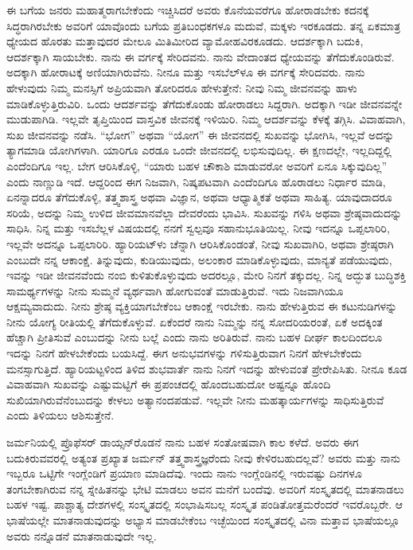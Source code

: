 ಈ ಬಗೆಯ ಜನರು ಮಹಾತ್ಮರಾಗಬೇಕೆಂದು ಇಚ್ಚಿಸಿದರೆ ಅವರು ಕೊನೆಯವರೆಗೂ ಹೋರಾಡಬೇಕು\enginline{-} ಕದನಕ್ಕೆ ಸಿದ್ಧರಾಗಿರಬೇಕು\enginline{-} ಅವರಿಗೆ ಯಾವೊಂದು ಬಗೆಯ ಪ್ರತಿಬಂಧಕಗಳೂ ಮದುವೆ, ಮಕ್ಕಳು ಇರಕೂಡದು. ತನ್ನ ಏಕಮಾತ್ರ ಧ್ಯೇಯದ ಹೊರತು ಮತ್ತಾವುದರ ಮೇಲೂ ಮಿತಿಮೀರಿದ ವ್ಯಾಮೋಹವಿರಕೂಡದು. ಆದರ್ಶಕ್ಕಾಗಿ ಬದುಕಿ, ಆದರ್ಶಕ್ಕಾಗಿ ಸಾಯಬೇಕು. ನಾನು ಈ ವರ್ಗಕ್ಕೆ ಸೇರಿದವನು. ನಾನು ವೇದಾಂತದ ಧ್ಯೇಯವನ್ನು ತೆಗೆದುಕೊಂಡಿರುವೆ. ಅದಕ್ಕಾಗಿ ಹೋರಾಟಕ್ಕೆ ಅಣಿಯಾಗಿರುವೆನು. ನೀನೂ ಮತ್ತು ಇಸಬೆಲ್‌ಳೂ ಈ ವರ್ಗಕ್ಕೆ ಸೇರಿದವರು. ನಾನು ಹೇಳುವುದು ನಿಮ್ಮ ಮನಸ್ಸಿಗೆ ಅಪ್ರಿಯವಾಗಿ ತೋರಿದರೂ ಹೇಳುತ್ತೇನೆ: ನೀವು ನಿಮ್ಮ ಜೀವನವನ್ನು ಹಾಳು ಮಾಡಿಕೊಳ್ಳುತ್ತಿರುವಿರಿ. ಒಂದು ಆದರ್ಶವನ್ನು ತೆಗೆದುಕೊಂಡು ಹೋರಾಡಲು ಸಿದ್ದರಾಗಿ. ಅದಕ್ಕಾಗಿ ಇಡೀ ಜೀವನವನ್ನೇ ಮುಡುಪಾಗಿಡಿ. ಇಲ್ಲವೇ ತೃಪ್ತಿಯಿಂದ ವಾಸ್ತವಿಕ ಜೀವನಕ್ಕೆ ಇಳಿಯಿರಿ. ನಿಮ್ಮ ಆದರ್ಶವನ್ನು ಕೆಳಕ್ಕೆ ತಗ್ಗಿಸಿ. ವಿವಾಹವಾಗಿ, ಸುಖ ಜೀವನವನ್ನು ನಡೆಸಿ. “ಭೋಗ” ಅಥವಾ “ಯೋಗ”\enginline{-} ಈ ಜೀವನದಲ್ಲಿ ಸುಖವನ್ನು ಭೋಗಿಸಿ, ಇಲ್ಲವೆ ಅದನ್ನು ತ್ಯಾಗಮಾಡಿ ಯೋಗಿಗಳಾಗಿ. ಯಾರಿಗೂ ಎರಡೂ ಒಂದೇ ಜೀವನದಲ್ಲಿ ಲಭಿಸುವುದಿಲ್ಲ. ಈ ಕ್ಷಣದಲ್ಲೇ, ಇಲ್ಲದಿದ್ದಲ್ಲಿ ಎಂದೆಂದಿಗೂ ಇಲ್ಲ. ಬೇಗ ಆರಿಸಿಕೊಳ್ಳಿ, ``ಯಾರು ಬಹಳ ಚೌಕಾಶಿ ಮಾಡುವರೋ ಅವರಿಗೆ ಏನೂ ಸಿಕ್ಕುವುದಿಲ್ಲ'' ಎಂದು ನಾಣ್ಣುಡಿ ಇದೆ. ಆದ್ದರಿಂದ ಈಗ ನಿಜವಾಗಿ, ನಿಷ್ಕಪಟವಾಗಿ ಎಂದೆಂದಿಗೂ ಹೊರಾಡಲು ನಿರ್ಧಾರ ಮಾಡಿ, ಏನನ್ನಾದರೂ ತೆಗೆದುಕೊಳ್ಳಿ, ತತ್ತ್ವಶಾಸ್ತ್ರ ಅಥವಾ ವಿಜ್ಞಾನ, ಅಥವಾ ಆಧ್ಯಾತ್ಮಿಕತೆ ಅಥವಾ ಸಾಹಿತ್ಯ. ಯಾವುದಾದರೂ ಸರಿಯೆ, ಅದನ್ನು ನಿಮ್ಮ ಉಳಿದ ಜೀವಮಾನವೆಲ್ಲಾ ದೇವರೆಂದು ಭಾವಿಸಿ. ಸುಖವನ್ನು ಗಳಿಸಿ ಅಥವಾ ಶ್ರೇಷ್ಠವಾದುದನ್ನು ಸಾಧಿಸಿ. ನಿನ್ನ ಮತ್ತು ಇಸಬೆಲ್ಲಳ ವಿಷಯದಲ್ಲಿ ನನಗೆ ಸ್ವಲ್ಪವೂ ಸಹಾನುಭೂತಿಯಿಲ್ಲ. ನೀವು ಇದನ್ನೂ ಒಪ್ಪಲಾರಿರಿ, ಇಲ್ಲವೇ ಅದನ್ನೂ ಒಪ್ಪಲಾರಿರಿ. ಹ್ಯಾರಿಯಟ್‌ಳು ಚೆನ್ನಾಗಿ ಆರಿಸಿಕೊಂಡಂತೆ, ನೀವು ಸುಖವಾಗಿರಿ, ಅಥವಾ ಶ್ರೇಷ್ಠರಾಗಿ ಎಂಬುದೇ ನನ್ನ ಆಕಾಂಕ್ಷೆ. ತಿನ್ನುವುದು, ಕುಡಿಯುವುದು, ಅಲಂಕಾರ ಮಾಡಿಕೊಳ್ಳುವುದು, ಮಾನ್ಯತೆ ಪಡೆಯುವುದು, ಇವನ್ನು ಇಡೀ ಜೀವನವೆಂದು ನಂಬಿ ಕುಳಿತುಕೊಳ್ಳುವುದು\enginline{-} ಅದರಲ್ಲೂ, ಮೇರಿ ನಿನಗೆ ತಕ್ಕುದಲ್ಲ. ನಿನ್ನ ಅದ್ಭುತ ಬುದ್ಧಿಶಕ್ತಿ ಸಾಮರ್ಥ್ಯಗಳನ್ನು ನೀನು ಸುಮ್ಮನೆ ವ್ಯರ್ಥವಾಗಿ ಹೋಗುವಂತೆ ಮಾಡುತ್ತಿರುವೆ. ಇದು ನಿಜವಾಗಿಯೂ ಆಕ್ಷಮ್ಯವಾದುದು. ನೀನು ಶ್ರೇಷ್ಠ ವ್ಯಕ್ತಿಯಾಗಬೇಕೆಂಬ ಆಕಾಂಕ್ಷೆ ಇರಬೇಕು. ನಾನು ಹೇಳುತ್ತಿರುವ ಈ ಕಟುನುಡಿಗಳನ್ನು ನೀನು ಯೋಗ್ಯ ರೀತಿಯಲ್ಲಿ ತೆಗೆದುಕೊಳ್ಳುವೆ. ಏಕೆಂದರೆ ನಾನು ನಿಮ್ಮನ್ನು ನನ್ನ ಸೋದರಿಯರಂತೆ, ಏಕೆ ಅದಕ್ಕಿಂತ ಹೆಚ್ಚಾಗಿ ಪ್ರೀತಿಸುವೆ ಎಂಬುದನ್ನು ನೀನು ಬಲ್ಲೆ ಎಂದು ನಾನು ಅರಿತಿರುವೆ. ನಾನು ಬಹಳ ದೀರ್ಘ ಕಾಲದಿಂದಲೂ ಇದನ್ನು ನಿನಗೆ ಹೇಳಬೇಕೆಂದು ಬಯಸಿದ್ದೆ. ಈಗ ಅನುಭವಗಳನ್ನು ಗಳಿಸುತ್ತಿರುವಾಗ ನಿನಗೆ ಹೇಳಬೇಕೆಂದು ಮನಸ್ಸಾಗುತ್ತಿದೆ. ಹ್ಯಾರಿಯಟ್ಟಳಿಂದ ತಿಳಿದ ಶುಭವಾರ್ತೆ ನಾನು ನಿನಗೆ ಇದನ್ನು ಹೇಳುವಂತೆ ಪ್ರೇರೇಪಿಸಿತು. ನೀನೂ ಕೂಡ ವಿವಾಹವಾಗಿ ಸುಖವನ್ನು ಎಷ್ಟುಮಟ್ಟಿಗೆ ಈ ಪ್ರಪಂಚದಲ್ಲಿ ಹೊಂದಬಹುದೋ ಅಷ್ಟನ್ನೂ ಹೊಂದಿ ಸುಖಿಯಾಗಿರುವೆನೆಂಬುದನ್ನು ಕೇಳಲು ಅತ್ಯಾನಂದಪಡುವೆ. ಇಲ್ಲವೇ ನೀನು ಮಹತ್ಕಾರ್ಯಗಳನ್ನು ಸಾಧಿಸುತ್ತಿರುವೆ ಎಂದು ತಿಳಿಯಲು ಆಶಿಸುತ್ತೇನೆ.

ಜರ್ಮನಿಯಲ್ಲಿ ಪ್ರೊಫೆಸರ್ ಡಾಯ್ಸನ್‌ರೊಡನೆ ನಾನು ಬಹಳ ಸಂತೋಷವಾಗಿ ಕಾಲ ಕಳೆದೆ. ಅವರು ಈಗ ಬದುಕಿರುವವರಲ್ಲಿ ಅತ್ಯಂತ ಪ್ರಖ್ಯಾತ ಜರ್ಮನ್ ತತ್ತ್ವಶಾಸ್ತ್ರಜ್ಞರೆಂದು ನೀವು ಕೇಳಿರಬಹುದಲ್ಲವೆ? ಅವರು ಮತ್ತು ನಾನು ಇಬ್ಬರೂ ಒಟ್ಟಿಗೇ ಇಂಗ್ಲೆಂಡಿಗೆ ಪ್ರಯಾಣ ಮಾಡಿದೆವು. ಇಂದು ನಾನು ಇಂಗ್ಲೆಂಡಿನಲ್ಲಿ ಇರುವಷ್ಟು ದಿನಗಳೂ ತಂಗಬೇಕಾಗಿರುವ ನನ್ನ ಸ್ನೇಹಿತನನ್ನು ಭೇಟಿ ಮಾಡಲು ಅವನ ಮನೆಗೆ ಬಂದೆವು. ಅವರಿಗೆ ಸಂಸ್ಕೃತದಲ್ಲಿ ಮಾತನಾಡಲು ಬಹಳ ಇಷ್ಟ. ಪಾಶ್ಚಾತ್ಯ ದೇಶಗಳಲ್ಲಿ ಸಂಸ್ಕೃತದಲ್ಲಿ ಸಂಭಾಷಿಸಬಲ್ಲ ಸಂಸ್ಕೃತ ಪಂಡಿತೋತ್ತಮರೆಂದರೆ ಇವರೊಬ್ಬರೇ. ಆ ಭಾಷೆಯಲ್ಲೇ ಮಾತನಾಡುವುದನ್ನು ಅಭ್ಯಾಸ ಮಾಡಬೇಕೆಂಬ ಇಚ್ಛೆಯಿಂದ ಸಂಸ್ಕೃತದಲ್ಲಿ ವಿನಾ ಮತ್ತಾವ ಭಾಷೆಯಲ್ಲೂ ಅವರು ನನ್ನೊಡನೆ ಮಾತನಾಡುವುದೇ ಇಲ್ಲ.

